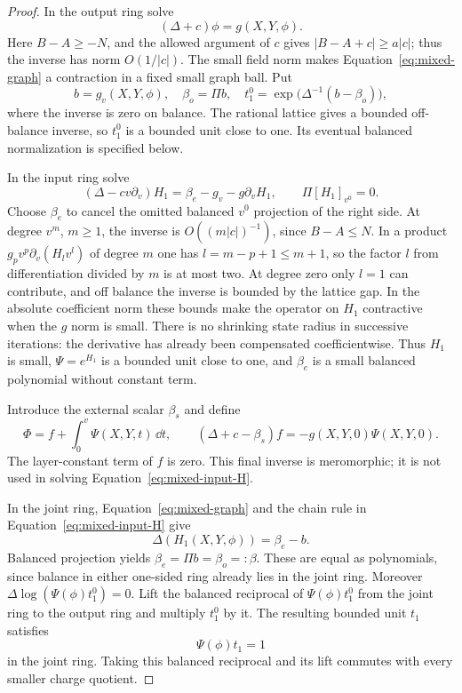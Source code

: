 \begin{proof}
In the output ring solve
\begin{equation}\label{eq:mixed-graph}
 (\Delta+c)\phi=g(X,Y,\phi).
\end{equation}
Here $B-A\geq-N$, and the allowed argument of $c$ gives
$|B-A+c|\geq a|c|$; thus the inverse has norm $O(1/|c|)$.
The small field norm makes Equation~\eqref{eq:mixed-graph} a
contraction in a fixed small graph ball. Put
\begin{equation}\label{eq:mixed-output-linear}
 b=g_v(X,Y,\phi),\quad \beta_o=\Pi b,\quad
 t_1^0=\exp\bigl(\Delta^{-1}(b-\beta_o)\bigr),
\end{equation}
where the inverse is zero on balance. The rational lattice gives
a bounded off-balance inverse, so $t_1^0$ is a bounded unit close
to one. Its eventual balanced normalization is specified below.

In the input ring solve
\begin{equation}\label{eq:mixed-input-H}
 (\Delta-cv\partial_v)H_1
       =\beta_e-g_v-g\partial_v H_1,
 \qquad \Pi[H_1]_{v^0}=0.
\end{equation}
Choose $\beta_e$ to cancel the omitted balanced $v^0$ projection
of the right side. At degree $v^m$, $m\geq1$, the inverse is
$O((m|c|)^{-1})$, since $B-A\leq N$. In a product
$g_pv^p\partial_v(H_l v^l)$ of degree $m$ one has
$l=m-p+1\leq m+1$, so the factor $l$ from differentiation divided
by $m$ is at most two. At degree zero only $l=1$ can contribute,
and off balance the inverse is bounded by the lattice gap.
In the absolute coefficient norm these bounds make the operator
on $H_1$ contractive when the $g$ norm is small. There is no
shrinking state radius in successive iterations: the derivative
has already been compensated coefficientwise. Thus $H_1$ is
small, $\Psi=e^{H_1}$ is a bounded unit close to one, and
$\beta_e$ is a small balanced polynomial without constant term.

Introduce the external scalar $\beta_s$ and define
\begin{equation}\label{eq:mixed-input-Phi}
 \Phi=f+\int_0^v\Psi(X,Y,t)\,\dd t,
 \qquad (\Delta+c-\beta_s)f=-g(X,Y,0)\Psi(X,Y,0).
\end{equation}
The layer-constant term of $f$ is zero. This final inverse is
meromorphic; it is not used in solving
Equation~\eqref{eq:mixed-input-H}.

In the joint ring, Equation~\eqref{eq:mixed-graph} and the chain
rule in Equation~\eqref{eq:mixed-input-H} give
\[
 \Delta(H_1(X,Y,\phi))=\beta_e-b.
\]
Balanced projection yields $\beta_e=\Pi b=\beta_o=:\beta$.
These are equal as polynomials, since balance in either one-sided
ring already lies in the joint ring. Moreover
$\Delta\log(\Psi(\phi)t_1^0)=0$. Lift the balanced reciprocal
of $\Psi(\phi)t_1^0$ from the joint ring to the output ring and
multiply $t_1^0$ by it. The resulting bounded unit $t_1$ satisfies
\begin{equation}\label{eq:mixed-normalization}
 \Psi(\phi)t_1=1
\end{equation}
in the joint ring. Taking this balanced reciprocal and its lift
commutes with every smaller charge quotient.


\end{proof}
